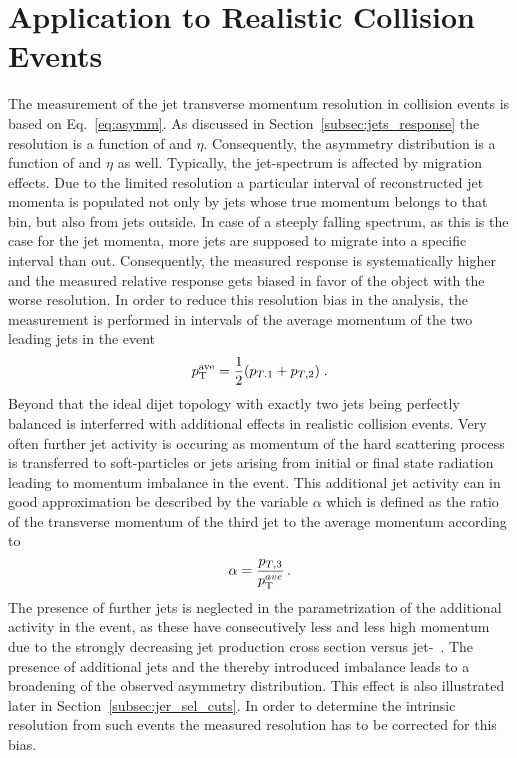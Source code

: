 \section{Application to Realistic Collision Events}
\label{sec:jer_application}
The measurement of the jet transverse momentum resolution in collision events is based on Eq.~\ref{eq:asymm}. As discussed in Section~\ref{subsec:jets_response} the resolution is a function of \pt and $\eta$. Consequently, the asymmetry distribution is a function of \pt and $\eta$ as well. Typically, the jet-\pt spectrum is affected by migration effects. Due to the limited resolution a particular interval of reconstructed jet momenta is populated not only by jets whose true momentum belongs to that bin, but also from jets outside. In case of a steeply falling spectrum, as this is the case for the jet momenta, more jets are supposed to migrate into a specific interval than out. Consequently, the measured response is systematically higher and the measured relative response gets biased in favor of the object with the worse resolution. In order to reduce this resolution bias in the analysis, the measurement is performed in intervals of the average momentum of the two leading jets in the event
\begin{equation}
p^{\text{ave}}_{\text{T}} = \frac{1}{2}(p_{T.1} + p_{T,2}) \; .
\end{equation}
Beyond that the ideal dijet topology with exactly two jets being perfectly balanced is interferred with additional effects in realistic collision events. Very often further jet activity is occuring as momentum of the hard scattering process is transferred to soft-particles or jets arising from initial or final state radiation leading to momentum imbalance in the event. This additional jet activity can in good approximation be described by the variable $\alpha$ which is defined as the ratio of the transverse momentum of the third jet to the average momentum according to
 \begin{equation}
\label{eq:alpha}
\alpha = \frac{p_{T,3}}{p_{\text{T}}^{ave}} \, .
\end{equation}
The presence of further jets is neglected in the parametrization of the additional activity in the event, as these have consecutively less and less high momentum due to the strongly decreasing jet production cross section versus jet-\pt~\cite{CMS-PAS-QCD-11-004}. The presence of additional jets and the thereby introduced imbalance leads to a broadening of the observed asymmetry distribution. This effect is also illustrated later in Section~\ref{subsec:jer_sel_cuts}. In order to determine the intrinsic resolution from such events the measured resolution has to be corrected for this bias. \\
